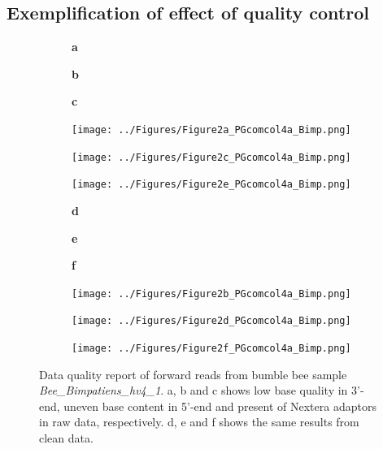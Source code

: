 \documentclass[11pt]{article}
\begin{document}
  \subsection{Exemplification of effect of quality control}
  \begin{figure}[H]
    \begin{subfigure}
      \centering
      \textbf{a}
    \end{subfigure}
    \hspace{0.32\linewidth}
    \begin{subfigure}
      \centering
      \textbf{b}
    \end{subfigure}
    \hspace{0.32\linewidth}
    \begin{subfigure}
      \centering
      \textbf{c}
    \end{subfigure}
    \newline
    \hfill
    \begin{subfigure}
      \centering
      \texttt{[image: ../Figures/Figure2a\_PGcomcol4a\_Bimp.png]}
    \end{subfigure}
    \hfill
    \begin{subfigure}
      \centering
      \texttt{[image: ../Figures/Figure2c\_PGcomcol4a\_Bimp.png]}
    \end{subfigure}
    \hfill
    \begin{subfigure}
      \centering
      \texttt{[image: ../Figures/Figure2e\_PGcomcol4a\_Bimp.png]}
    \end{subfigure}
    \newline
    \begin{subfigure}
      \centering
      \textbf{d}
    \end{subfigure}
    \hspace{0.32\linewidth}
    \begin{subfigure}
      \centering
      \textbf{e}
    \end{subfigure}
    \hspace{0.32\linewidth}
    \begin{subfigure}
      \centering
      \textbf{f}
    \end{subfigure}
    \newline
    \hfill
    \begin{subfigure}
      \centering
      \texttt{[image: ../Figures/Figure2b\_PGcomcol4a\_Bimp.png]}
    \end{subfigure}
    \hfill
    \begin{subfigure}
      \centering
      \texttt{[image: ../Figures/Figure2d\_PGcomcol4a\_Bimp.png]}
    \end{subfigure}
    \hfill
    \begin{subfigure}
      \centering
      \texttt{[image: ../Figures/Figure2f\_PGcomcol4a\_Bimp.png]}
    \end{subfigure}
    \caption{Data quality report of forward reads from bumble bee sample \textit{Bee\_Bimpatiens\_hv4\_1}. 
    a, b and c shows low base quality in 3'-end, uneven base content in 5'-end and present of Nextera adaptors in raw data, respectively. 
    d, e and f shows the same results from clean data.}
    \label{QC}
    \end{figure}
\end{document}
